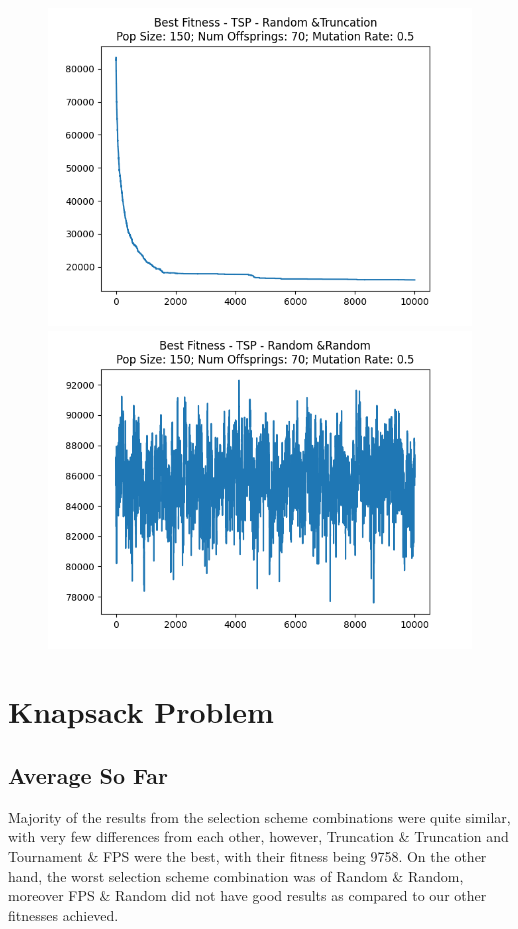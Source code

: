 \documentclass[12pt]{report}
\theoremstyle{mytheoremstyle}
\theoremstyle{mytheoremstyle}
\theoremstyle{myproblemstyle}
\begin{document}
\begin{figure}[!]
\begin{minipage}{0.4\textwidth}
		\includegraphics[width=\linewidth]{../Analysis/BSF_TSP_4_3_150_70.png}
	\end{minipage}
	\hspace{\fill}
	\begin{minipage}{0.4\textwidth}
		\includegraphics[width=\linewidth]{../Analysis/BSF_TSP_4_4_150_70.png}
	\end{minipage}
\end{figure}
\newpage

\section{Knapsack Problem}

\subsection{Average So Far}
Majority of the results from the selection scheme combinations were quite similar, with very few differences from each other, however, Truncation \& Truncation and Tournament \& FPS were the best, with their fitness being 9758. On the other hand, the worst selection scheme combination was of Random \& Random, moreover FPS \& Random did not have good results as compared to our other fitnesses achieved.
\end{document}
